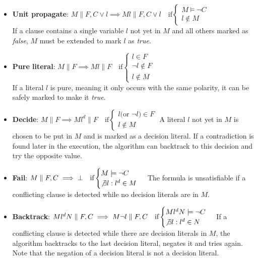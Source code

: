 \begin{itemize}
    \item \textbf{Unit propagate}: $M \parallel F, C \lor l \implies M l \parallel F, C \lor l \quad \text{if} \begin{cases} M \models \neg C \\ l \not \in M \end{cases}$ \\
          If a clause contains a single variable $l$ not yet in $M$ and all others marked as \textit{false}, $M$ must be extended to mark $l$ as \textit{true}.
    \item \textbf{Pure literal}: $M \parallel F \implies M l \parallel F  \quad \text{if} \begin{cases} l \in F \\ \neg l \not \in F \\ l \not \in M \end{cases}$ \\
          If a literal $l$ is pure, meaning it only occurs with the same polarity, it can be safely marked to make it \textit{true}.
    \item \textbf{Decide}: $M \parallel F \implies M l^d \parallel F  \quad \text{if} \begin{cases} l \text{(or } \neg l \text{)} \in F \\ l \not \in M \end{cases}$
          A literal $l$ not yet in $M$ is chosen to be put in $M$ and is marked as a decision literal. If a contradiction is found later in the execution, the algorithm can backtrack to this decision and try the opposite value.
    \item \textbf{Fail}: $M \parallel F, C \implies \bot  \quad \text{if} \begin{cases} M \models \neg C \\ \not \exists l: l^d \in M \end{cases}$
          The formula is unsatisfiable if a conflicting clause is detected while no decision literals are in $M$.
    \item \textbf{Backtrack}: $M l^d N \parallel F, C \implies M \neg l \parallel F, C  \quad \text{if} \begin{cases} M l^d N \models \neg C \\ \not \exists l: l^d \in N \end{cases}$
          If a conflicting clause is detected while there are decision literals in $M$, the algorithm backtracks to the last decision literal, negates it and tries again. Note that the negation of a decision literal is not a decision literal.
\end{itemize}

